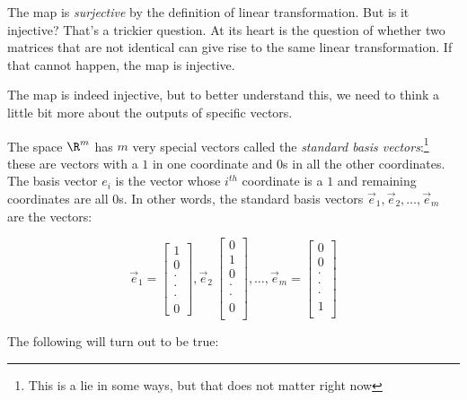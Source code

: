 \documentclass[10pt]{amsart}
\begin{document}
The map is {\em surjective} by the definition of linear
transformation. But is it injective? That's a trickier question. At
its heart is the question of whether two matrices that are not
identical can give rise to the same linear transformation. If that
cannot happen, the map is injective.

The map is indeed injective, but to better understand this, we need to
think a little bit more about the outputs of specific vectors.

The space $\R^m$ has $m$ very special vectors called the {\em standard
  basis vectors}:\footnote{This is a lie in some ways, but that does
  not matter right now} these are vectors with a $1$ in one coordinate
and $0$s in all the other coordinates. The basis vector $e_i$ is the
vector whose $i^{th}$ coordinate is a $1$ and remaining coordinates
are all $0$s. In other words, the standard basis vectors
$\vec{e}_1,\vec{e}_2,\dots,\vec{e}_m$ are the vectors:

$$\vec{e}_1 = \left[\begin{matrix} 1 \\ 0 \\ \cdot \\ \cdot \\ \cdot \\ 0 \end{matrix}\right], \vec{e}_2 \ \left[\begin{matrix} 0 \\ 1 \\ 0 \\ \cdot \\ \cdot \\ 0 \\\end{matrix}\right], \dots, \vec{e}_m = \left[\begin{matrix} 0 \\ 0 \\ \cdot \\ \cdot \\ \cdot \\ 1 \\\end{matrix}\right]$$

The following will turn out to be true:
\end{document}
